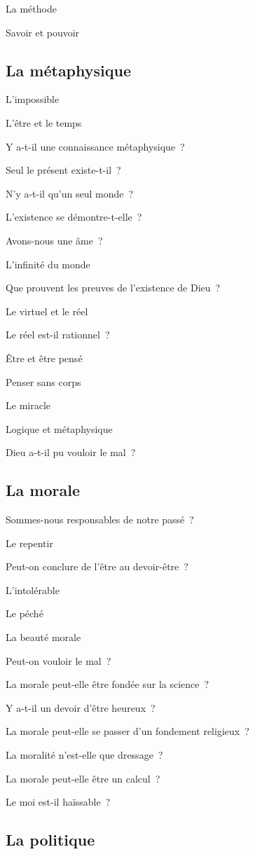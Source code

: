 \documentclass[a4paper]{article}
\begin{document}
La méthode

Savoir et pouvoir
\subsection{La métaphysique}
\label{sec-6-3}


L'impossible

L'être et le temps

Y a-t-il une connaissance métaphysique ?

Seul le présent existe-t-il ?

N'y a-t-il qu'un seul monde ?

L'existence se démontre-t-elle ?

Avons-nous une âme ?

L'infinité du monde

Que prouvent les preuves de l'existence de Dieu ?

Le virtuel et le réel

Le réel est-il rationnel ?

Être et être pensé

Penser sans corps

Le miracle

Logique et métaphysique

Dieu a-t-il pu vouloir le mal ?
\subsection{La morale}
\label{sec-6-4}


Sommes-nous responsables de notre passé ?

Le repentir

Peut-on conclure de l'être au devoir-être ?

L'intolérable

Le péché

La beauté morale

Peut-on vouloir le mal ?

La morale peut-elle être fondée sur la science ?

Y a-t-il un devoir d'être heureux ?

La morale peut-elle se passer d'un fondement religieux ?

La moralité n'est-elle que dressage ?

La morale peut-elle être un calcul ?

Le moi est-il haïssable ?
\subsection{La politique}
\label{sec-6-5}
\end{document}
